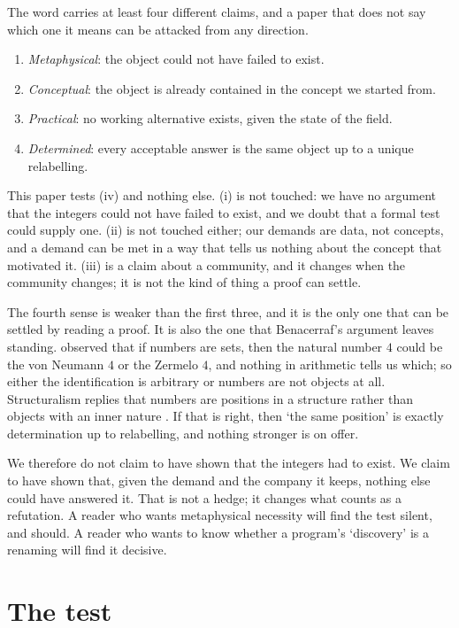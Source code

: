 \documentclass[12pt,a4paper]{article}
\begin{document}
The word carries at least four different claims, and a paper that does not say
which one it means can be attacked from any direction.

\begin{enumerate}[label=(\roman*),leftmargin=2.2em]
\item \emph{Metaphysical}: the object could not have failed to exist.
\item \emph{Conceptual}: the object is already contained in the concept we
      started from.
\item \emph{Practical}: no working alternative exists, given the state of the
      field.
\item \emph{Determined}: every acceptable answer is the same object up to a
      unique relabelling.
\end{enumerate}

This paper tests (iv) and nothing else.  (i) is not touched: we have no argument
that the integers could not have failed to exist, and we doubt that a formal test
could supply one.  (ii) is not touched either; our demands are data, not
concepts, and a demand can be met in a way that tells us nothing about the
concept that motivated it.  (iii) is a claim about a community, and it changes
when the community changes; it is not the kind of thing a proof can settle.

The fourth sense is weaker than the first three, and it is the only one that can
be settled by reading a proof.  It is also the one that Benacerraf's argument
leaves standing.  \citet{benacerraf1965} observed that if numbers are sets, then the
natural number $4$ could be the von Neumann $4$ or the Zermelo $4$, and nothing in
arithmetic tells us which; so either the identification is arbitrary or numbers
are not objects at all.  Structuralism replies that numbers are positions in a
structure rather than objects with an inner nature \citep{shapiro1997}.  If that is
right, then `the same position' is exactly determination up to relabelling, and
nothing stronger is on offer.

We therefore do not claim to have shown that the integers had to exist.  We claim
to have shown that, given the demand and the company it keeps, nothing else could
have answered it.  That is not a hedge; it changes what counts as a refutation.  A
reader who wants metaphysical necessity will find the test silent, and should.  A
reader who wants to know whether a program's `discovery' is a renaming will find
it decisive.

\section{The test}
\label{sec:test}
\end{document}
